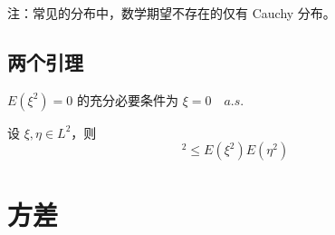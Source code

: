 \documentclass[12pt,a4paper]{amsart}
\begin{document}
注：常见的分布中，数学期望不存在的仅有 Cauchy 分布。

\subsection{两个引理}

\begin{proposition}
    $E(\xi^2)=0$ 的充分必要条件为 $\xi = 0 \quad a.s.$
\end{proposition}

\begin{proposition}
    设 $\xi, \eta \in L^2$，则
    \begin{equation}
        [E(\xi\eta)]^2 \leq E(\xi^2)E(\eta^2)
    \end{equation}
\end{proposition}


\section{方差}

\appendix



{\footnotesize}
\end{document}
